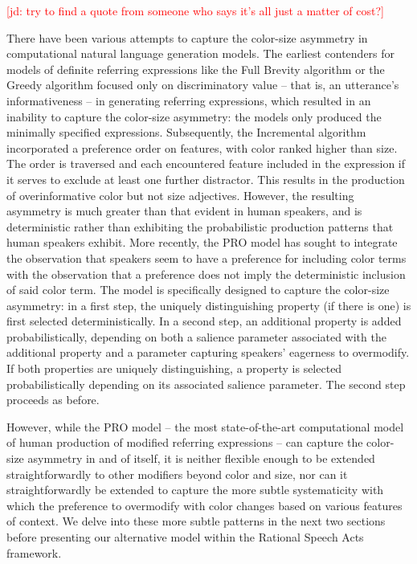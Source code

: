 \documentclass[11pt]{article}
\newcommand{\jd}[1]{\textcolor{Red}{[jd: #1]}}
\begin{document}
\jd{try to find a quote from someone who says it's all just a matter of cost?}

There have been various attempts to capture the color-size asymmetry in computational natural language generation models. The earliest contenders for models of definite referring expressions like the Full Brevity algorithm \cite{Dale1989} or the Greedy algorithm \cite{Dale1989} focused only on discriminatory value -- that is, an utterance's informativeness -- in generating referring expressions, which resulted in an inability to capture the color-size asymmetry: the models only produced the minimally specified expressions. Subsequently, the Incremental algorithm \cite{dale1995} incorporated a preference order on features, with color ranked higher than size. The order is traversed and each encountered feature included in the expression if it serves to exclude at least one further distractor. This results in the production of overinformative color but not size adjectives. However, the resulting asymmetry is much greater than that evident in human speakers, and is deterministic rather than exhibiting the probabilistic production patterns that human speakers exhibit. More recently, the PRO model \cite{GattEtAl2013} has sought to integrate the observation that speakers seem to have a preference for including color terms with the observation that a preference does not imply the deterministic inclusion of said color term. The model is specifically designed to capture the color-size asymmetry: in a first step, the uniquely distinguishing property (if there is one) is first selected deterministically.  In a second step, an additional property is added probabilistically, depending on both a salience parameter associated with the additional property and a parameter capturing speakers' eagerness to overmodify. If both properties are uniquely distinguishing, a property is selected probabilistically depending on its associated salience parameter. The second step proceeds as before.

However, while the PRO model -- the most state-of-the-art computational model of human production of modified referring expressions -- can capture the color-size asymmetry in and of itself, it is neither flexible enough to be extended straightforwardly to other modifiers beyond color and size, nor can it straightforwardly be extended to capture the more subtle systematicity with which the preference to overmodify with color changes based on various features of context. We delve into these more subtle patterns in the next two sections before presenting our alternative model within the Rational Speech Acts framework.
\end{document}
